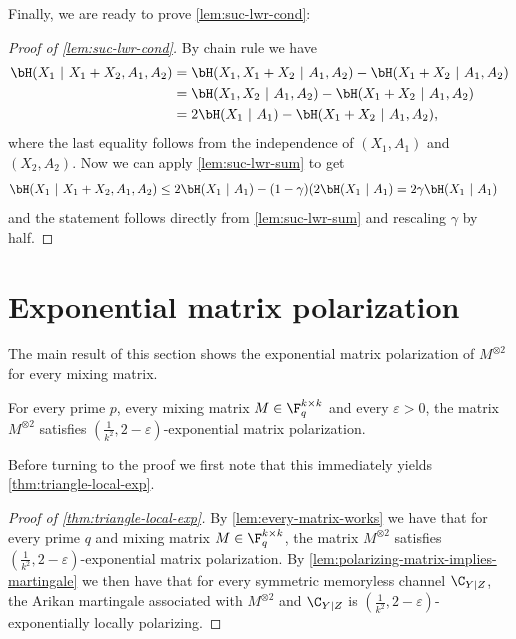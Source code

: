 \documentclass[11pt]{article}
\begin{document}
Finally, we are ready to prove \cref{lem:suc-lwr-cond}:
\begin{proof}[Proof of \cref{lem:suc-lwr-cond}]
	By chain rule we have
	\begin{align*}
		\bH(X_1 ~|~ X_1 + X_2, A_1, A_2) & = \bH(X_1, X_1 + X_2 ~|~ A_1, A_2) - \bH(X_1 + X_2 ~|~ A_1, A_2) \\
		& = \bH(X_1, X_2 ~|~ A_1, A_2) - \bH(X_1 + X_2 ~|~ A_1, A_2) \\
		& = 2 \bH(X_1 ~|~ A_1) - \bH(X_1 + X_2 ~|~ A_1, A_2),
	\end{align*}
	where the last equality follows from the independence of $(X_1,A_1)$ and $(X_2,A_2)$.
	Now we can apply \cref{lem:suc-lwr-sum} to get
	\begin{align*}
		\bH(X_1 ~|~ X_1 + X_2, A_1, A_2) & \leq 2 \bH(X_1 ~|~ A_1) - (1 - \gamma)(2 \bH(X_1 ~|~ A_1) = 2 \gamma \bH(X_1 ~|~ A_1)
	\end{align*}
	and the statement follows directly from \cref{lem:suc-lwr-sum} and rescaling $\gamma$ by half.
\end{proof}

\section{Exponential matrix  polarization}\label{sec:exp-local-arikan}

The main result of this section shows the exponential matrix polarization of $M^{\otimes 2}$ for every mixing matrix.

\begin{lemma}
	\label{lem:every-matrix-works}
	For every prime $p$, every mixing matrix $M \in \F_q^{k \times k}$ and every $\varepsilon > 0$, the matrix $M^{\otimes 2}$ satisfies $(\frac{1}{k^2}, 2-\varepsilon)$-exponential matrix polarization.
\end{lemma}

Before turning to the proof we first note that this immediately yields \cref{thm:triangle-local-exp}. 

\begin{proof}[Proof of \cref{thm:triangle-local-exp}]
	By \cref{lem:every-matrix-works} we have that for every prime $q$ and mixing matrix $M\in\F_q^{k \times k}$, the matrix $M^{\otimes 2}$ satisfies $(\frac{1}{k^2}, 2-\varepsilon)$-exponential matrix polarization. By \cref{lem:polarizing-matrix-implies-martingale} we then have that for every symmetric memoryless channel $\C_{Y|Z}$, the Arikan martingale associated with $M^{\otimes 2}$ and $\C_{Y|Z}$ is $(\frac{1}{k^2}, 2-\varepsilon)$-exponentially locally polarizing.
\end{proof}
\end{document}

